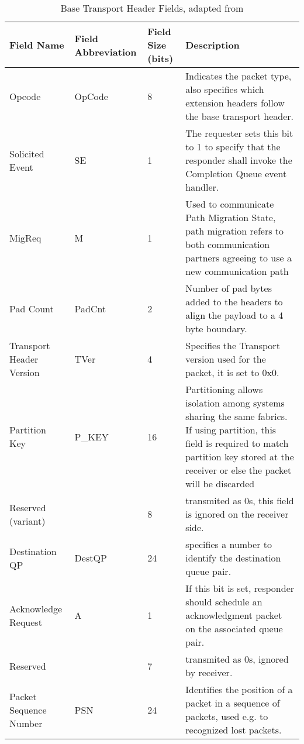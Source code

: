 \begin{table}[h]
  \begin{tabular}{|| m{10em} | m{4em} | m{3em} | m{15em} ||}
    \hline
    Field Name & Field Abbreviation & Field Size (bits) & Description\\
    \hline
    Opcode & OpCode & 8 & Indicates the packet type, also specifies which extension headers follow the base transport header.\\
    \hline
    Solicited Event & SE & 1 &  The requester sets this bit to 1 to specify that the responder shall invoke the Completion Queue event handler.\\
    \hline
    MigReq & M & 1 &  Used to communicate Path Migration State, path migration refers to both communication partners agreeing to use a new communication path\\
    \hline
    Pad Count & PadCnt & 2 &  Number of pad bytes added to the headers to align the payload to a 4 byte boundary.\\
    \hline
    Transport Header Version & TVer & 4 &  Specifies the Transport version used for the packet, it is set to 0x0.\\
    \hline
    Partition Key & P\_KEY & 16 &  Partitioning allows isolation among systems sharing the same fabrics. If using partition, this field is required to match partition key stored at the receiver or else the packet will be discarded\\
    \hline
    Reserved (variant) & & 8 &  transmited as 0s, this field is ignored on the receiver side.\\
    \hline
    Destination QP & DestQP & 24 &  specifies a number to identify the destination queue pair.\\
    \hline
    Acknowledge Request & A & 1 &  If this bit is set, responder should schedule an acknowledgment packet on the associated queue pair.\\
    \hline
    Reserved & & 7 &  transmited as 0s, ignored by receiver. \\
    \hline
    Packet Sequence Number & PSN & 24 &  Identifies the position of a packet in a sequence of packets, used e.g. to recognized lost packets.\\
    \hline
  \end{tabular}
  \caption[Base Transport Header Fields]{Base Transport Header Fields, adapted from\cite{infinibandvol107}}
  \label{tab:bthfields}
\end{table}

